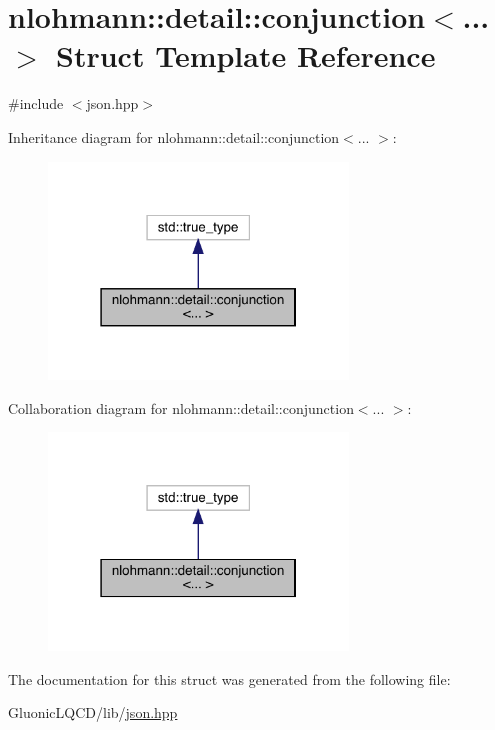 \hypertarget{structnlohmann_1_1detail_1_1conjunction}{}\section{nlohmann\+::detail\+::conjunction$<$... $>$ Struct Template Reference}
\label{structnlohmann_1_1detail_1_1conjunction}


{\ttfamily \#include $<$json.\+hpp$>$}



Inheritance diagram for nlohmann\+::detail\+::conjunction$<$... $>$\+:
\nopagebreak
\begin{figure}[H]
\begin{center}
\leavevmode
\includegraphics[width=226pt]{structnlohmann_1_1detail_1_1conjunction__inherit__graph}
\end{center}
\end{figure}


Collaboration diagram for nlohmann\+::detail\+::conjunction$<$... $>$\+:
\nopagebreak
\begin{figure}[H]
\begin{center}
\leavevmode
\includegraphics[width=226pt]{structnlohmann_1_1detail_1_1conjunction__coll__graph}
\end{center}
\end{figure}


The documentation for this struct was generated from the following file\+:\begin{DoxyCompactItemize}
\item 
Gluonic\+L\+Q\+C\+D/lib/\mbox{\hyperlink{json_8hpp}{json.\+hpp}}\end{DoxyCompactItemize}
